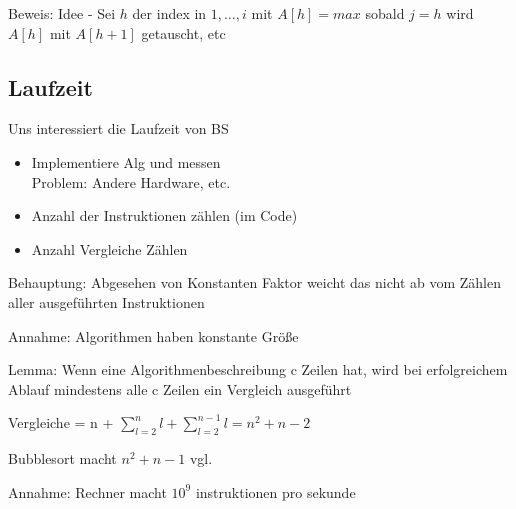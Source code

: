 \documentclass{article}
\begin{document}
Beweis: Idee - Sei $h$ der index in ${1,\hdots,i}$ mit $A[h] = max$
sobald $j=h$ wird $A[h]$ mit $A[h+1]$ getauscht, etc

\subsection{Laufzeit}
Uns interessiert die Laufzeit von BS
\begin{itemize}
	\item{Implementiere Alg und messen\\
		Problem: Andere Hardware, etc.}
	\item{Anzahl der Instruktionen zählen (im Code)}
	\item{Anzahl Vergleiche Zählen}
\end{itemize}
Behauptung: Abgesehen von Konstanten Faktor weicht das nicht ab vom Zählen aller 
ausgeführten Instruktionen

Annahme: Algorithmen haben konstante Größe

Lemma: Wenn eine Algorithmenbeschreibung c Zeilen hat, wird bei erfolgreichem Ablauf mindestens alle c 
Zeilen ein Vergleich ausgeführt

Vergleiche = n + $\sum_{l=2}^n l + \sum_{l=2}^{n-1} l =  n^2+n-2$

Bubblesort macht $n^2+n-1$ vgl.

Annahme: Rechner macht $10^9$ instruktionen pro sekunde
\end{document}
